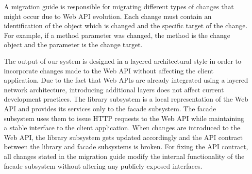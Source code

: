 A migration guide is responsible for migrating different types of changes that might occur due to Web API evolution. Each change must contain an identification of the object which is changed and the specific target of the change. For example, if a method parameter was changed, the method is the change object and the parameter is the change target.

\begin{figure}[!h]
\end{figure}

The output of our system is designed in a layered architectural style in order to incorporate changes made to the Web API without affecting the client application. Due to the fact that Web APIs are already integrated using a layered network architecture, introducing additional layers does not affect current development practices. The library subsystem is a local representation of the Web API and provides its services only to the facade subsystem. The facade subsystem uses them to issue HTTP requests to the Web API while maintaining a stable interface to the client application. When changes are introduced to the Web API, the library subsystem gets updated accordingly and the API contract between the library and facade subsystems is broken. For fixing the API contract, all changes stated in the migration guide modify the internal functionality of the facade subsystem without altering any publicly exposed interfaces. 

